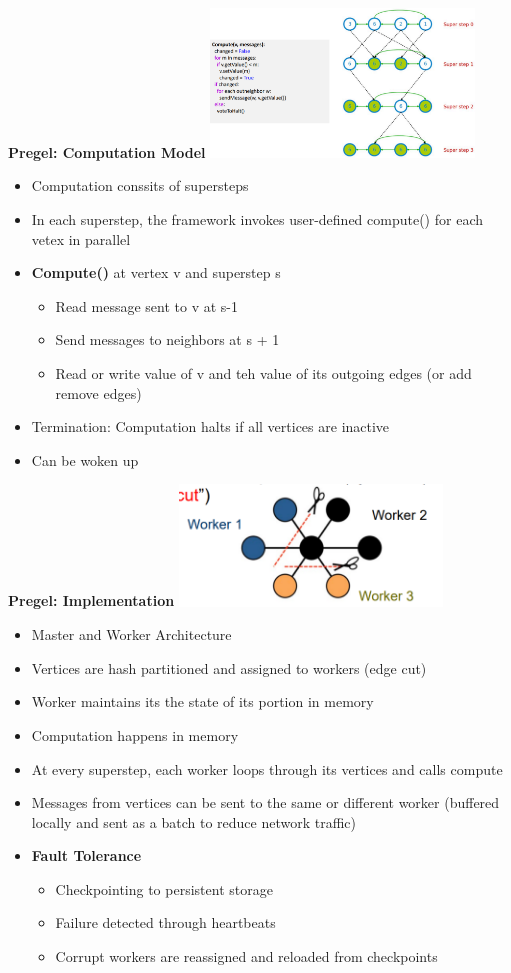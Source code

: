 \documentclass[10pt, landscape]{article}
\begin{document}
\begin{multicols}{4}
\textbf{Pregel: Computation Model}
\includegraphics*[width=7cm]{compute.png}
\begin{itemize}
  \item Computation conssits of supersteps
  \item In each superstep, the framework invokes user-defined compute() for each vetex in parallel 
  \item \textbf{Compute()} at vertex v and superstep s
  \begin{itemize}
    \item Read message sent to v at s-1
    \item Send messages to neighbors at s + 1 
    \item Read or write value of v and teh value of its outgoing edges (or add remove edges)
  \end{itemize}
  \item Termination: Computation halts if all vertices are inactive 
  \item Can be woken up 
\end{itemize}

\textbf{Pregel: Implementation}
\includegraphics*[width=7cm]{pregel_impl.png}
\begin{itemize}
  \item Master and Worker Architecture
  \item Vertices are  hash partitioned and assigned to workers (edge cut) 
  \item Worker maintains its the state of its portion in memory 
  \item Computation happens in memory
  \item At every superstep, each worker loops through its vertices and calls compute 
  \item Messages from vertices can be sent to the same or different worker (buffered locally and sent as a batch to reduce network traffic)
  \item \textbf{Fault Tolerance} 
  \begin{itemize}
    \item Checkpointing to persistent storage 
    \item Failure detected through heartbeats 
    \item Corrupt workers are reassigned and reloaded from checkpoints
  \end{itemize}
\end{itemize}


\end{multicols}
\end{document}
